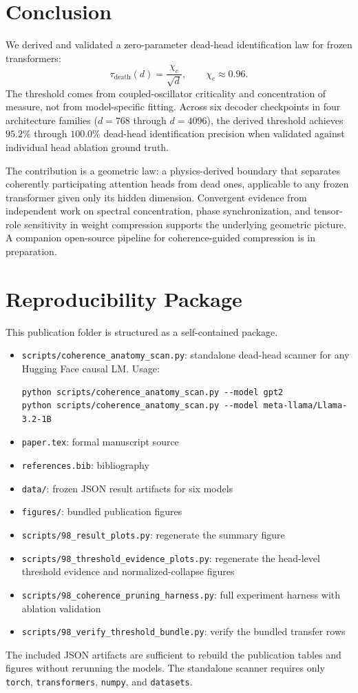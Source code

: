 \documentclass[aps,prd,onecolumn,superscriptaddress,showpacs,12pt]{revtex4-2}
\newcommand{\taudeath}{\tau_{\mathrm{death}}}
\newcommand{\chic}{\chi_c}
\begin{document}
\section{Conclusion}

We derived and validated a zero-parameter dead-head identification law for frozen
transformers:
\begin{equation}
\boxed{\taudeath(d)=\frac{\chic}{\sqrt{d}}}, \qquad \chic \approx 0.96.
\end{equation}
The threshold comes from coupled-oscillator criticality and concentration of
measure, not from model-specific fitting. Across six decoder checkpoints in four
architecture families ($d=768$ through $d=4096$), the derived threshold achieves
$95.2\%$ through $100.0\%$ dead-head identification precision when validated
against individual head ablation ground truth.

The contribution is a geometric law: a physics-derived boundary that separates
coherently participating attention heads from dead ones, applicable to any frozen
transformer given only its hidden dimension. Convergent evidence from independent
work on spectral concentration, phase synchronization, and tensor-role sensitivity
in weight compression supports the underlying geometric picture. A companion
open-source pipeline for coherence-guided compression is in preparation.

\appendix

\section{Reproducibility Package}

This publication folder is structured as a self-contained package.

\begin{itemize}
\item \texttt{scripts/coherence\_anatomy\_scan.py}: standalone dead-head scanner
for any Hugging Face causal LM. Usage:
\begin{verbatim}
python scripts/coherence_anatomy_scan.py --model gpt2
python scripts/coherence_anatomy_scan.py --model meta-llama/Llama-3.2-1B
\end{verbatim}
\item \texttt{paper.tex}: formal manuscript source
\item \texttt{references.bib}: bibliography
\item \texttt{data/}: frozen JSON result artifacts for six models
\item \texttt{figures/}: bundled publication figures
\item \texttt{scripts/98\_result\_plots.py}: regenerate the summary figure
\item \texttt{scripts/98\_threshold\_evidence\_plots.py}: regenerate the head-level
threshold evidence and normalized-collapse figures
\item \texttt{scripts/98\_coherence\_pruning\_harness.py}: full experiment harness
with ablation validation
\item \texttt{scripts/98\_verify\_threshold\_bundle.py}: verify the bundled
transfer rows
\end{itemize}

The included JSON artifacts are sufficient to rebuild the publication tables and
figures without rerunning the models. The standalone scanner requires only
\texttt{torch}, \texttt{transformers}, \texttt{numpy}, and \texttt{datasets}.



\end{document}

